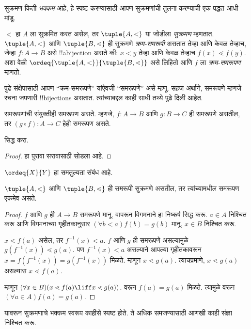 \documentclass[../../../include/open-logic-section]{subfiles}
\begin{document}

सुक्रमण किती \emph{भक्कम} आहे, हे स्पष्ट करण्यासाठी आपण सुक्रमणांची तुलना करण्याची एक पद्धत आधी मांडू.

\begin{defn}
$<$ हा $A$ ला सुक्रमित करत असेल, तर $\tuple{A, <}$ या जोडीला \emph{सुक्रमण} म्हणतात. $\tuple{A, <}$ आणि $\tuple{B,
\lessdot}$ ही सुक्रमणे \emph{क्रम-समरूपी} असतात तेव्हा आणि केवळ तेव्हाच, जेव्हा $f \colon A \to B$ असे !!a{bijection} असते की: $x < y$ तेव्हा आणि केवळ तेव्हाच $f(x) \lessdot  f(y)$. अशा वेळी $\ordeq{\tuple{A, <}}{\tuple{B, \lessdot}}$ असे लिहितो आणि $f$ ला \emph{क्रम-समरूपण} म्हणतो.
\end{defn}
\noindent
पुढे संक्षेपासाठी आपण ``क्रम-समरूपणे'' यांऐवजी ``समरूपणे'' असे म्हणू. सहज अर्थाने, समरूपणे म्हणजे रचना जपणारी !!{bijection}s असतात. त्यांच्याबद्दल काही साधी तथ्ये पुढे दिली आहेत.

\begin{lem}
समरूपणांची संयुक्तीही समरूपण असते. म्हणजे, $f \colon A
\to B$ आणि $g \colon B \to C$ ही समरूपणे असतील, तर $(g \circ f)
\colon A \to C$ हेही समरूपण असते.
\end{lem}
\begin{prob}
	 सिद्ध करा.
\end{prob}
\begin{proof}
हा पुरावा सरावासाठी सोडला आहे.
\end{proof}
\begin{cor}
	$\ordeq{X}{Y}$ हा समतुल्यता संबंध आहे.
\end{cor}
\begin{prop}
$\tuple{A, <}$ आणि $\tuple{B, \lessdot}$ ही समरूपी सुक्रमणे असतील, तर त्यांच्यामधील समरूपण एकमेव असते.
\end{prop}

\begin{proof}
$f$ आणि $g$ ही $A \to B$ समरूपणे मानू.  वापरून विगमनाने हा निष्कर्ष सिद्ध करू.
$a\in A$ निश्चित करू आणि विगमनाच्या गृहीतकानुसार $(\forall b < a)f(b) = g(b)$ मानू. $x \in B$ निश्चित करू.

$x \lessdot f(a)$ असेल, तर $f^{-1}(x) < a$. $f$ आणि $g$ ही समरूपणे असल्यामुळे $g(f^{-1}(x)) \lessdot
g(a)$. पण $f^{-1}(x) < a$ असल्याने आपल्या गृहीतकावरून $x =f(f^{-1}(x)) = g(f^{-1}(x))$ मिळते. म्हणून $x \lessdot g(a)$. त्याचप्रमाणे, $x \lessdot g(a)$ असल्यास $x \lessdot
f(a)$.

म्हणून $(\forall x \in B)(x \lessdot f(a) \liff x \lessdot
g(a))$.  वरून $f(a) = g(a)$ मिळते. त्यामुळे  वरून $(\forall
a \in A)f(a) = g(a)$.
\end{proof}\noindent
यावरून सुक्रमणाचे भक्कम स्वरूप काहीसे स्पष्ट होते. ते अधिक समजण्यासाठी आणखी काही संज्ञा निश्चित करू.
\end{document}
